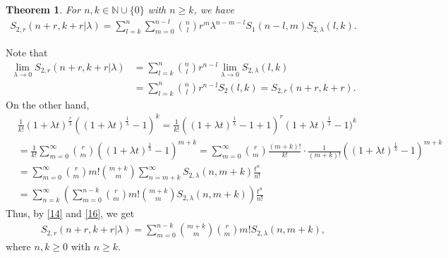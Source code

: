 \documentclass[10pt,twoside,reqno]{amsart}
\numberwithin{equation}{section}
\newtheorem{thm}{\bf Theorem}[section]
\begin{document}
\begin{thm}
For $n,k \in \mathbb{N} \cup \{0\}$ with $n \geq k$, we have
\begin{equation*}\begin{split}
S_{2,r}(n+r,k+r|\lambda ) = \sum_{l=k}^n \sum_{m=0}^{n-l} {n \choose l} r^m \lambda ^{n-m-l} S_1(n-l,m) S_{2,\lambda }(l,k).
\end{split}\end{equation*}
\end{thm}

Note that
\begin{equation*}\begin{split}
\lim_{\lambda  \rightarrow 0}S_{2,r}(n+r,k+r|\lambda ) &= \sum_{l=k}^n {n \choose l} r^{n-l} \lim_{\lambda  \rightarrow 0} S_{2,\lambda }(l,k)\\
&= \sum_{l=k}^n {n \choose l} r^{n-l} S_2(l,k) = S_{2,r}(n+r,k+r).
\end{split}\end{equation*}
On the other hand,
\begin{equation}\begin{split}\label{16}
& \frac{1}{k!} (1+\lambda t)^{\frac{r}{\lambda }} ((1+\lambda t)^{\frac{1}{\lambda }}-1)^k = \frac{1}{k!} ((1+\lambda t)^{\frac{1}{\lambda }}-1+1)^r (1+\lambda t)^{\frac{1}{\lambda }}-1)^k\\
&= \frac{1}{k!} \sum_{m=0}^\infty {r \choose m} ((1+\lambda t)^{\frac{1}{\lambda }}-1)^{m+k} = \sum_{m=0}^\infty {r \choose m} \frac{	(m+k)!}{	k!} \cdot \frac{1}{(m+k)!} ((1+\lambda t)^{\frac{1}{\lambda }}-1)^{m+k}\\
&=\sum_{m=0}^\infty {r \choose m} m! {m+k \choose m} \sum_{n=m+k}^\infty S_{2,\lambda }(n,m+k) \frac{t^n}{n!} \\
&= \sum_{n=k}^\infty \left( \sum_{m=0}^{n-k} {r \choose m} m! {m+k \choose m} S_{2,\lambda }(n,m+k) \right) \frac{t^n}{n!}
 \end{split}\end{equation}
Thus, by \eqref{14} and \eqref{16}, we get
\begin{equation}\begin{split}\label{17}
S_{2,r}(n+r,k+r|\lambda ) = \sum_{m=0}^{n-k} {m+k \choose m}{r \choose m} m!  S_{2,\lambda }(n,m+k),
\end{split}\end{equation}
where $n,k \geq 0$ with $n \geq k$.
\end{document}
